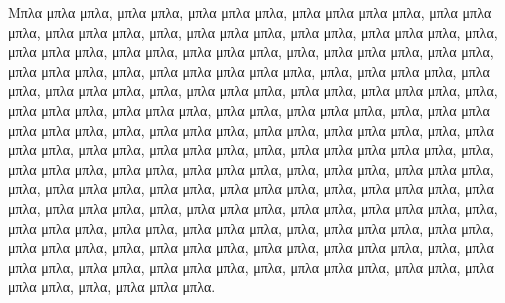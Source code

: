 Μπλα μπλα μπλα, μπλα μπλα, μπλα μπλα μπλα, μπλα μπλα μπλα μπλα,
μπλα μπλα μπλα, μπλα μπλα μπλα, μπλα, μπλα μπλα μπλα, μπλα μπλα,
μπλα μπλα μπλα, μπλα, μπλα μπλα μπλα, μπλα μπλα, μπλα μπλα μπλα,
μπλα, μπλα μπλα μπλα, μπλα μπλα, μπλα μπλα μπλα, μπλα, μπλα μπλα
μπλα μπλα μπλα, μπλα, μπλα μπλα μπλα, μπλα μπλα, μπλα μπλα μπλα,
μπλα, μπλα μπλα μπλα, μπλα μπλα, μπλα μπλα μπλα, μπλα, μπλα μπλα
μπλα, μπλα μπλα μπλα, μπλα μπλα, μπλα μπλα μπλα, μπλα, μπλα μπλα
μπλα μπλα μπλα, μπλα, μπλα μπλα μπλα, μπλα μπλα, μπλα μπλα μπλα,
μπλα, μπλα μπλα μπλα, μπλα μπλα, μπλα μπλα μπλα, μπλα, μπλα μπλα
μπλα μπλα μπλα, μπλα, μπλα μπλα μπλα, μπλα μπλα, μπλα μπλα μπλα,
μπλα, μπλα μπλα, μπλα μπλα μπλα, μπλα, μπλα μπλα μπλα, μπλα μπλα,
μπλα μπλα μπλα, μπλα, μπλα μπλα μπλα, μπλα μπλα, μπλα μπλα μπλα,
μπλα, μπλα μπλα μπλα, μπλα μπλα, μπλα μπλα μπλα, μπλα, μπλα μπλα
μπλα, μπλα μπλα, μπλα μπλα μπλα, μπλα, μπλα μπλα μπλα, μπλα μπλα,
μπλα μπλα μπλα, μπλα, μπλα μπλα μπλα, μπλα μπλα, μπλα μπλα μπλα,
μπλα, μπλα μπλα μπλα, μπλα μπλα, μπλα μπλα μπλα, μπλα, μπλα μπλα
μπλα, μπλα μπλα, μπλα μπλα μπλα, μπλα, μπλα μπλα μπλα.

